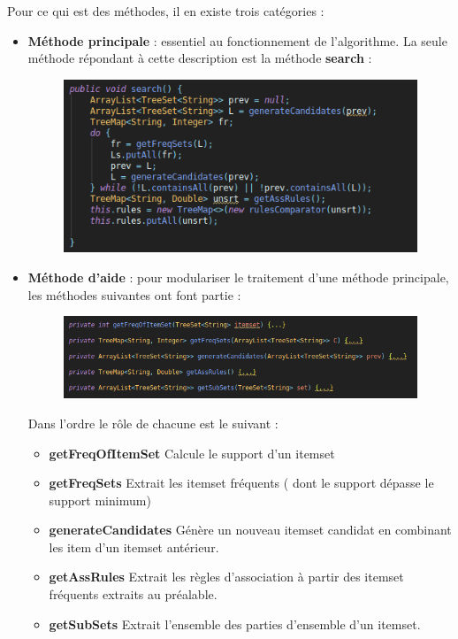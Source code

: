 			\par 
			Pour ce qui est des méthodes, il en existe trois catégories :
			\begin{itemize}
				\item \textbf{Méthode principale} : essentiel au fonctionnement de l'algorithme. La seule méthode répondant à cette description est la méthode \textbf{search} : 
				\begin{figure}[H]
					\centering
					\includegraphics[width=0.6\linewidth]{apriori/images/data_structs/searcher/search.png}
				\end{figure}
				\item \textbf{Méthode d'aide} : pour modulariser le traitement d'une méthode principale, les méthodes suivantes ont font partie : 
				\begin{figure}[H]
					\centering
					\includegraphics[width=0.75\linewidth]{apriori/images/data_structs/searcher/helpers.png}
				\end{figure}
				\par Dans l'ordre le rôle de chacune est le suivant :
				\begin{itemize}
					\item \textbf{getFreqOfItemSet} Calcule le support d'un itemset
					\item \textbf{getFreqSets} Extrait les itemset fréquents ( dont le support dépasse le support minimum)
					\item \textbf{generateCandidates} Génère un nouveau itemset candidat en combinant les item d'un itemset antérieur.
					\item \textbf{getAssRules} Extrait les règles d'association à partir des itemset fréquents extraits au préalable.
					\item \textbf{getSubSets} Extrait l'ensemble des parties d'ensemble d'un itemset. 
				\end{itemize}

\end{itemize}
